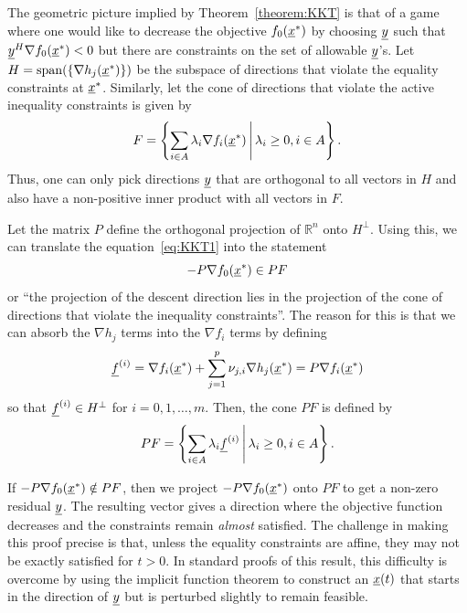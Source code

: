 The geometric picture implied by Theorem~\ref{theorem:KKT} is that of a game where one would like to decrease the objective $f_0 (\underline{x}^*)$ by choosing $\underline{y}$ such that $\underline{y}^H \nabla f_0 (\underline{x}^*) < 0$ but there are  constraints on the set of allowable $\underline{y}$'s.
Let $H = \mathrm{span} ( \{ \nabla h_j (\underline{x}^*) \})$ be the subspace of directions that violate the equality constraints at $\underline{x}^*$.
Similarly, let the cone of directions that violate the active inequality constraints is given by
\[ F = \left\{ \sum_{i\in A} \lambda_i \nabla f_i (\underline{x}^*) \, \middle| \, \lambda_i \geq 0, i \in A   \right\}. \]
Thus, one can only pick directions $\underline{y}$ that are orthogonal to all vectors in $H$ and also have a non-positive inner product with all vectors in $F$.

Let the matrix $P$ define the orthogonal projection of $\mathbb{R}^n$ onto $H^\perp$.
Using this, we can translate the equation~\eqref{eq:KKT1} into the statement
\[ -P \nabla f_0 (\underline{x}^*) \in P F \]  or ``the projection of the descent direction lies in the projection of the cone of directions that violate the inequality constraints''.
The reason for this is that we can absorb the $\nabla h_j$ terms into the $\nabla f_i$ terms by defining
\[ \underline{f}^{(i)} = \nabla f_i (\underline{x}^*) + \sum_{j=1}^p \nu_{j,i} \nabla h_j (\underline{x}^*) = P \nabla f_i (\underline{x}^*) \]
so that $\underline{f}^{(i)} \in H^{\perp}$ for $i=0,1,\ldots,m$.
Then, the cone $PF$ is defined by
\[ PF = \left\{ \sum_{i\in A} \lambda_i \underline{f}^{(i)} \, \middle| \, \lambda_i \geq 0, i\in A \right\}. \]

If $-P \nabla f_0 (\underline{x}^*) \notin P F$, then we project $-P \nabla f_0 (\underline{x}^*)$ onto $PF$ to get a non-zero residual $\underline{y}$.
The resulting vector gives a direction where the objective function decreases and the constraints remain \emph{almost} satisfied.
The challenge in making this proof precise is that, unless the equality constraints are affine, they may not be exactly satisfied for $t>0$.
In standard proofs of this result, this difficulty is overcome by using the implicit function theorem to construct an $\underline{x} (t)$ that starts in the direction of $\underline{y}$ but is perturbed slightly to remain feasible.

